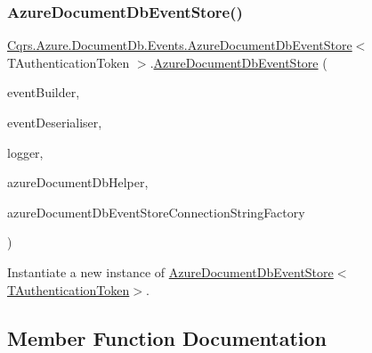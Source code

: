 \subsubsection{\texorpdfstring{Azure\+Document\+Db\+Event\+Store()}{AzureDocumentDbEventStore()}}
{\footnotesize\ttfamily \hyperlink{classCqrs_1_1Azure_1_1DocumentDb_1_1Events_1_1AzureDocumentDbEventStore}{Cqrs.\+Azure.\+Document\+Db.\+Events.\+Azure\+Document\+Db\+Event\+Store}$<$ T\+Authentication\+Token $>$.\hyperlink{classCqrs_1_1Azure_1_1DocumentDb_1_1Events_1_1AzureDocumentDbEventStore}{Azure\+Document\+Db\+Event\+Store} (\begin{DoxyParamCaption}\item[{\hyperlink{interfaceCqrs_1_1Events_1_1IEventBuilder}{I\+Event\+Builder}$<$ T\+Authentication\+Token $>$}]{event\+Builder,  }\item[{\hyperlink{interfaceCqrs_1_1Events_1_1IEventDeserialiser}{I\+Event\+Deserialiser}$<$ T\+Authentication\+Token $>$}]{event\+Deserialiser,  }\item[{I\+Logger}]{logger,  }\item[{\hyperlink{interfaceCqrs_1_1Azure_1_1DocumentDb_1_1IAzureDocumentDbHelper}{I\+Azure\+Document\+Db\+Helper}}]{azure\+Document\+Db\+Helper,  }\item[{\hyperlink{interfaceCqrs_1_1Azure_1_1DocumentDb_1_1Events_1_1IAzureDocumentDbEventStoreConnectionStringFactory}{I\+Azure\+Document\+Db\+Event\+Store\+Connection\+String\+Factory}}]{azure\+Document\+Db\+Event\+Store\+Connection\+String\+Factory }\end{DoxyParamCaption})}



Instantiate a new instance of \hyperlink{classCqrs_1_1Azure_1_1DocumentDb_1_1Events_1_1AzureDocumentDbEventStore_a0bbf294600f2dcebfcca28143aacd430_a0bbf294600f2dcebfcca28143aacd430}{Azure\+Document\+Db\+Event\+Store$<$\+T\+Authentication\+Token$>$}. 



\subsection{Member Function Documentation}
\mbox{\label{classCqrs_1_1Azure_1_1DocumentDb_1_1Events_1_1AzureDocumentDbEventStore_a54f298fdde141166e23f01e4911bf188_a54f298fdde141166e23f01e4911bf188}} 
